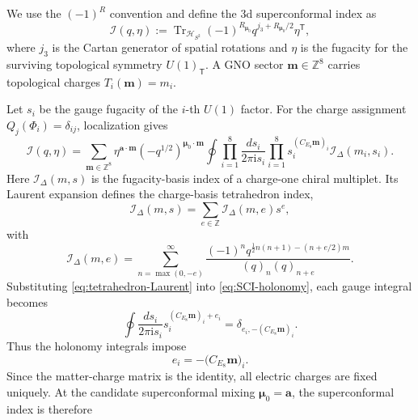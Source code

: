 \documentclass[11pt,a4paper]{article}
\numberwithin{equation}{section}
\begin{document}
We use the $(-1)^R$ convention and define the 3d superconformal index as~\cite{Kim:2009wb,Imamura:2011su}
\begin{equation}
  \mathcal I(q,\eta)
  :=\operatorname{Tr}_{\mathcal H_{S^2}}
  (-1)^{R_{\boldsymbol\mu_0}}
  q^{j_3+R_{\boldsymbol\mu_0}/2}\eta^{\mathsf T},
  \label{eq:SCI-definition}
\end{equation}
where $j_3$ is the Cartan generator of spatial rotations and $\eta$ is the fugacity for the surviving topological symmetry $U(1)_{\mathsf T}$.  A GNO sector $\boldsymbol m\in\mathbb Z^8$ carries topological charges $T_i(\boldsymbol m)=m_i$.

Let $s_i$ be the gauge fugacity of the $i$-th $U(1)$ factor.  For the charge assignment $Q_j(\Phi_i)=\delta_{ij}$, localization gives
\begin{equation}
  \mathcal I(q,\eta)
  =\sum_{\boldsymbol m\in\mathbb Z^8}
  \eta^{\boldsymbol a\cdot\boldsymbol m}
  \left(-q^{1/2}\right)^{\boldsymbol\mu_0\cdot\boldsymbol m}
  \oint\prod_{i=1}^{8}\frac{ds_i}{2\pi \mathrm{i} s_i}
  \prod_{i=1}^{8}s_i^{(C_{E_8}\boldsymbol m)_i}
  \mathcal I_\Delta(m_i,s_i).
  \label{eq:SCI-holonomy}
\end{equation}
Here $\mathcal I_\Delta(m,s)$ is the fugacity-basis index of a charge-one chiral multiplet.  Its Laurent expansion defines the charge-basis tetrahedron index,
\begin{equation}
  \mathcal I_\Delta(m,s)
  =\sum_{e\in\mathbb Z}\mathcal I_\Delta(m,e)s^e,
  \label{eq:tetrahedron-Laurent}
\end{equation}
with
\begin{equation}
  \mathcal I_\Delta(m,e)
  =\sum_{n=\max(0,-e)}^\infty
  \frac{(-1)^n q^{\frac12 n(n+1)-(n+e/2)m}}
  {(q)_n(q)_{n+e}}.
  \label{eq:tetrahedron-index}
\end{equation}
Substituting \eqref{eq:tetrahedron-Laurent} into \eqref{eq:SCI-holonomy}, each gauge integral becomes
\begin{equation}
  \oint\frac{ds_i}{2\pi \mathrm{i} s_i}
  s_i^{(C_{E_8}\boldsymbol m)_i+e_i}
  =\delta_{e_i,-(C_{E_8}\boldsymbol m)_i}.
  \label{eq:SCI-Gauss-law-projection}
\end{equation}
Thus the holonomy integrals impose
\begin{equation}
  e_i=-\bigl(C_{E_8}\boldsymbol m\bigr)_i.
  \label{eq:SCI-Gauss-law}
\end{equation}
Since the matter-charge matrix is the identity, all electric charges are fixed uniquely.  At the candidate superconformal mixing $\boldsymbol\mu_0=\boldsymbol a$, the superconformal index is therefore
\end{document}
